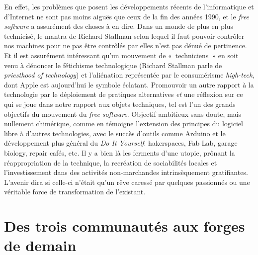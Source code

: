 \documentclass{FramateX}
\begin{document}
\begin{refsection}
En effet, les problèmes que posent les développements récents de
l'informatique et d'Internet ne sont
pas moins aiguës que ceux de la fin des années 1990, et le \textit{free
software} a assurément des choses à en dire. Dans un monde de plus en
plus technicisé, le mantra de Richard Stallman selon lequel il
faut pouvoir contrôler nos machines pour ne pas être contrôlés par
elles n'est pas dénué de pertinence. Et il est
assurément intéressant qu'un mouvement de
«~techniciens~» en soit venu à dénoncer le fétichisme technologique
(Richard Stallman parle de \textit{priesthood of technology}) et
l'aliénation représentée par le consumérisme
\textit{high-tech}, dont Apple est aujourd'hui le
symbole éclatant. Promouvoir un autre rapport à la technologie par le
déploiement de pratiques alternatives \textit{et} une réflexion sur ce
qui se joue dans notre rapport aux objets techniques, tel est
l'un des grands objectifs du mouvement du \textit{free
software}. Objectif ambitieux sans doute, mais nullement chimérique,
comme en témoigne l'extension des principes du
logiciel libre à d'autres technologies, avec le succès
d'outils comme Arduino et le développement plus
général du \textit{Do It Yourself}:  hakerspaces, Fab Lab,
garage biology, repair cafés, etc. Il y a bien là les
ferments d'une utopie, prônant la réappropriation de
la technique, la recréation de sociabilités locales et
l'investissement dans des activités non-marchandes
intrinsèquement gratifiantes. L'avenir dira si
celle-ci n'était qu'un rêve caressé
par quelques passionnés ou une véritable force de transformation de
l'existant. 









\printbibliography[heading=subbibliography]
\end{refsection}







\chapter*{Des trois communautés aux forges de demain}        
{}
\end{document}
